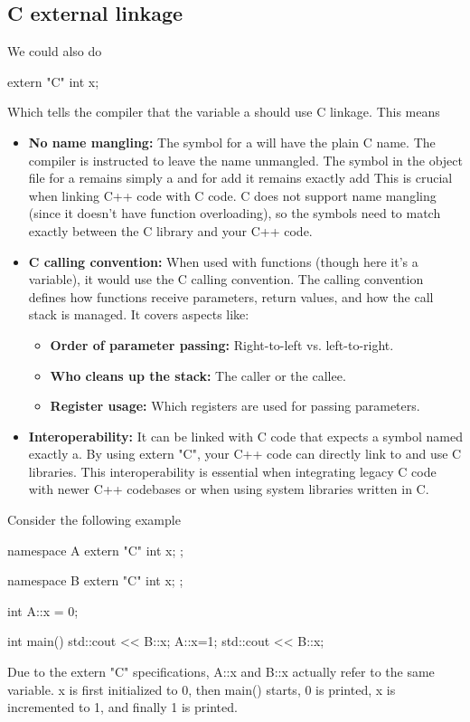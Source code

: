 \documentclass{report}
\begin{document}
\subsection{C external linkage}
\bigbreak \noindent 
We could also do
\bigbreak \noindent 
\begin{cppcode}
extern "C" int x;
\end{cppcode}
\bigbreak \noindent 
Which tells the compiler that the variable a should use C linkage. This means
\begin{itemize}
    \item \textbf{No name mangling:} The symbol for a will have the plain C name.
        \bigbreak \noindent 
        The compiler is instructed to leave the name unmangled. The symbol in the object file for a remains simply a and for add it remains exactly add
        \bigbreak \noindent 
        This is crucial when linking C++ code with C code. C does not support name mangling (since it doesn’t have function overloading), so the symbols need to match exactly between the C library and your C++ code.
    \item \textbf{C calling convention:} When used with functions (though here it’s a variable), it would use the C calling convention.
        \bigbreak \noindent 
        The calling convention defines how functions receive parameters, return values, and how the call stack is managed. It covers aspects like:
        \begin{itemize}
            \item \textbf{Order of parameter passing:} Right-to-left vs. left-to-right.
            \item \textbf{Who cleans up the stack:} The caller or the callee.
            \item \textbf{Register usage:} Which registers are used for passing parameters.
        \end{itemize}
    \item \textbf{Interoperability:} It can be linked with C code that expects a symbol named exactly a.
        \bigbreak \noindent 
        By using extern "C", your C++ code can directly link to and use C libraries. This interoperability is essential when integrating legacy C code with newer C++ codebases or when using system libraries written in C.
\end{itemize}
\bigbreak \noindent 
Consider the following example
\bigbreak \noindent 
\begin{cppcode}
    namespace A{
        extern "C" int x;
    };

    namespace B{
        extern "C" int x;
    };

    int A::x = 0;

    int main(){
        std::cout << B::x;
        A::x=1;
        std::cout << B::x;
    }
\end{cppcode}
\bigbreak \noindent 
Due to the extern "C" specifications, A::x and B::x actually refer to the same variable.
\bigbreak \noindent 
x is first initialized to 0, then main() starts, 0 is printed, x is incremented to 1, and finally 1 is printed.
\end{document}
